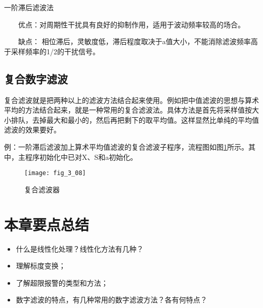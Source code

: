 \begin{remark}
  一阶滞后滤波法

　　优点：对周期性干扰具有良好的抑制作用，适用于波动频率较高的场合。

　　缺点： 相位滞后，灵敏度低，滞后程度取决于a值大小，不能消除滤波频率高于采样频率的1/2的干扰信号。
\end{remark}

\subsection{复合数字滤波}

复合滤波就是把两种以上的滤波方法结合起来使用。例如把中值滤波的思想与算术平均的方法结合起来，就是一种常用的复合滤波法。具体方法是首先将采样值按大小排队，去掉最大和最小的，然后再把剩下的取平均值。这样显然比单纯的平均值滤波的效果要好。


例：一阶滞后滤波加上算术平均值滤波的复合滤波子程序，流程图如图\ref{fig_3_08}所示。其中，主程序初始化中已对X、S和a初始化。

\begin{figure}
  \centering
  \texttt{[image: fig\_3\_08]}\\
  \caption{复合滤波器}\label{fig_3_08}
\end{figure}




\section{本章要点总结}


\begin{itemize}
  \item 什么是线性化处理？线性化方法有几种？

  \item 理解标度变换；

  \item 了解超限报警的类型和方法；

  \item 数字滤波的特点，有几种常用的数字滤波方法？各有何特点？

\end{itemize}
